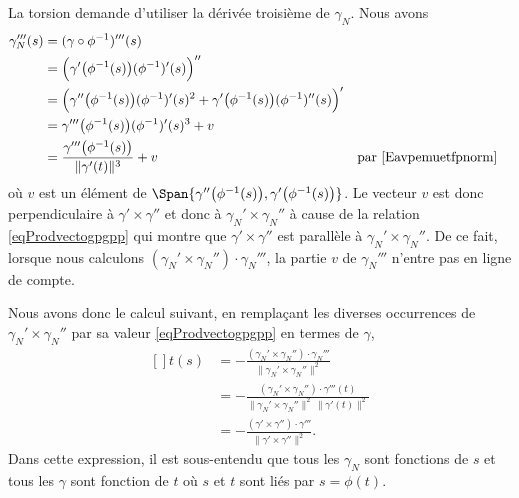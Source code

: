 La torsion demande d'utiliser la dérivée troisième de \( \gamma_N\). Nous avons
\begin{equation}
	\begin{aligned}[]
		\gamma_N'''(s) & =(\gamma\circ\phi^{-1})'''(s)                                                                                                                           \\
		               & =\Big( \gamma'\big( \phi^{-1}(s) \big)(\phi^{-1})'(s) \Big)''                                                                                           \\
		               & =\Big( \gamma''\big( \phi^{-1}(s) \big)(\phi^{-1})'(s)^2+\gamma'\big( \phi^{-1}(s) \big)(\phi^{-1})''(s) \Big)'                                         \\
		               & =\gamma'''\big( \phi^{-1}(s) \big)(\phi^{-1})'(s)^3+ v                                                                                                  \\
		               & =\frac{ \gamma'''\big( \phi^{-1}(s) \big) }{ \| \gamma'(t) \|^3 }+v                                             &  & \text{par \eqref{Eavpemuetfpnorm}}
	\end{aligned}
\end{equation}
où \( v\) est un élément de \( \Span\{  \gamma''\big( \phi^{-1}(s) \big),\gamma'\big( \phi^{-1}(s) \big)\}\). Le vecteur \( v\) est donc perpendiculaire à \( \gamma'\times \gamma''\) et donc à \( \gamma_N'\times \gamma_N''\) à cause de la relation \eqref{eqProdvectogpgpp} qui montre que \( \gamma'\times \gamma''\) est parallèle à \( \gamma_N'\times \gamma_N''\). De ce fait, lorsque nous calculons \( (\gamma_N'\times \gamma_N'')\cdot \gamma_N'''\), la partie \( v\) de \( \gamma_N'''\) n'entre pas en ligne de compte.

Nous avons donc le calcul suivant, en remplaçant les diverses occurrences de \( \gamma_N'\times \gamma_N''\) par sa valeur \eqref{eqProdvectogpgpp} en termes de \( \gamma\),
\begin{equation}
	\begin{aligned}[]
		t(s) & =-\frac{ (\gamma_N'\times \gamma_N'')\cdot \gamma_N''' }{ \| \gamma_N'\times \gamma_N'' \|^2 }                      \\
		     & =-\frac{ (\gamma_N'\times \gamma_N'')\cdot \gamma'''(t) }{ \| \gamma_N'\times \gamma_N'' \|^2\,\| \gamma'(t) \|^2 } \\
		     & =-\frac{ (\gamma'\times \gamma'')\cdot \gamma''' }{ \| \gamma'\times \gamma'' \|^2 }.
	\end{aligned}
\end{equation}
Dans cette expression, il est sous-entendu que tous les \( \gamma_N\) sont fonctions de \( s\) et tous les \( \gamma\) sont fonction de \( t\) où \( s\) et \( t\) sont liés par \( s=\phi(t)\).

